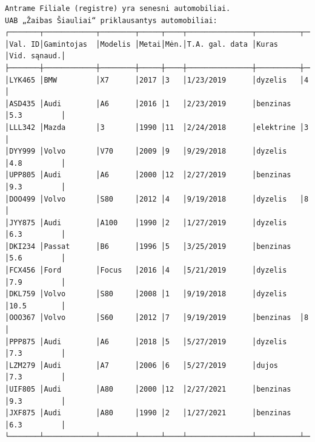 \documentclass{article}
\begin{document}
\footnotesize
\begin{verbatim}
Antrame Filiale (registre) yra senesni automobiliai.
UAB „Žaibas Šiauliai“ priklausantys automobiliai:
┌───────┬────────────┬────────┬─────┬────┬───────────────┬──────────┬────────────┐
│Val. ID│Gamintojas  │Modelis │Metai│Mėn.│T.A. gal. data │Kuras     │Vid. sąnaud.│
├───────┼────────────┼────────┼─────┼────┼───────────────┼──────────┼────────────┤
│LYK465 │BMW         │X7      │2017 │3   │1/23/2019      │dyzelis   │4           │
│ASD435 │Audi        │A6      │2016 │1   │2/23/2019      │benzinas  │5.3         │
│LLL342 │Mazda       │3       │1990 │11  │2/24/2018      │elektrine │3           │
│DYY999 │Volvo       │V70     │2009 │9   │9/29/2018      │dyzelis   │4.8         │
│UPP805 │Audi        │A6      │2000 │12  │2/27/2019      │benzinas  │9.3         │
│DOO499 │Volvo       │S80     │2012 │4   │9/19/2018      │dyzelis   │8           │
│JYY875 │Audi        │A100    │1990 │2   │1/27/2019      │dyzelis   │6.3         │
│DKI234 │Passat      │B6      │1996 │5   │3/25/2019      │benzinas  │5.6         │
│FCX456 │Ford        │Focus   │2016 │4   │5/21/2019      │dyzelis   │7.9         │
│DKL759 │Volvo       │S80     │2008 │1   │9/19/2018      │dyzelis   │10.5        │
│OOO367 │Volvo       │S60     │2012 │7   │9/19/2019      │benzinas  │8           │
│PPP875 │Audi        │A6      │2018 │5   │5/27/2019      │dyzelis   │7.3         │
│LZM279 │Audi        │A7      │2006 │6   │5/27/2019      │dujos     │7.3         │
│UIF805 │Audi        │A80     │2000 │12  │2/27/2021      │benzinas  │9.3         │
│JXF875 │Audi        │A80     │1990 │2   │1/27/2021      │benzinas  │6.3         │
└───────┴────────────┴────────┴─────┴────┴───────────────┴──────────┴────────────┘


\end{verbatim}
\end{document}
